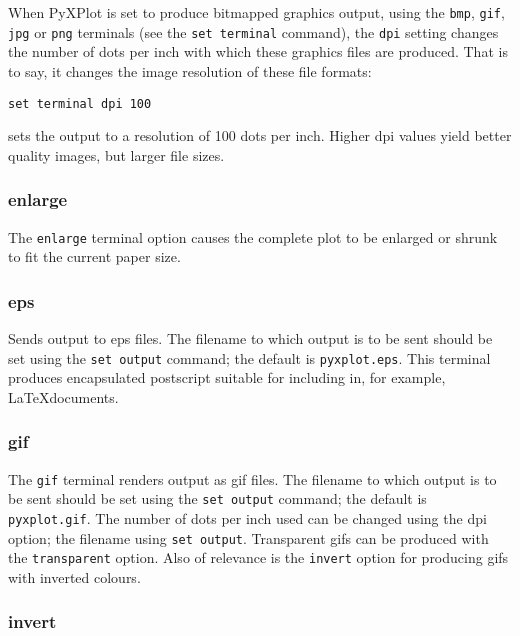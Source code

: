 When PyXPlot is set to produce bitmapped graphics output, using the {\tt bmp},
{\tt gif}, {\tt jpg} or {\tt png} terminals (see the {\tt set terminal}
command), the {\tt dpi} setting changes the number of dots per inch with which
these graphics files are produced. That is to say, it changes the image
resolution of these file formats:

\begin{verbatim}
set terminal dpi 100
\end{verbatim}

\noindent sets the output to a resolution of 100 dots per inch. Higher dpi
values yield better quality images, but larger file sizes.


\subsubsection{enlarge}

The {\tt enlarge} terminal option causes the complete plot to be enlarged or
shrunk to fit the current paper size.


\subsubsection{eps}

Sends output to eps files.  The filename to which output is to be sent should
be set using the {\tt set output} command; the default is
{\tt pyxplot.eps}.  This terminal produces encapsulated postscript
suitable for including in, for example, \LaTeX documents.


\subsubsection{gif}

The {\tt gif} terminal renders output as gif files. The filename to which output
is to be sent should be set using the {\tt set output} command; the default is
{\tt pyxplot.gif}. The number of dots per inch used can be changed using the dpi
option; the filename using {\tt set output}. Transparent gifs can be produced
with the {\tt transparent} option. Also of relevance is the {\tt invert} option
for producing gifs with inverted colours.


\subsubsection{invert}


